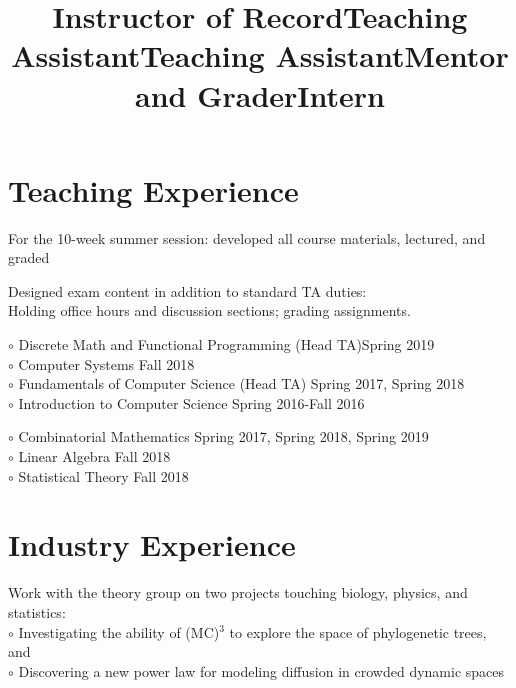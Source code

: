 \documentclass[margin]{res}
\begin{document}
\begin{resume}
\section{Teaching Experience}
\title{\textbf{Instructor of Record}}
\begin{position}
	For the 10-week summer session: developed all course materials, lectured, and graded
\end{position}

\title{\textbf{Teaching Assistant}}
\begin{position}
	Designed exam content in addition to standard TA duties: \\Holding office hours and discussion sections; grading assignments.
\end{position}

\dates{}
\title{\textbf{Teaching Assistant}}
\begin{position}
$\circ$ Discrete Math and Functional Programming (Head TA)\hfill Spring 2019\\
$\circ$ Computer Systems \hfill Fall 2018\\
$\circ$ Fundamentals of Computer Science (Head TA) \hfill Spring 2017, Spring 2018\\
$\circ$ Introduction to Computer Science \hfill Spring 2016-Fall 2016

\end{position}

\dates{}
\title{\textbf{Mentor and Grader}}
\begin{position}
$\circ$ Combinatorial Mathematics \hfill Spring 2017, Spring 2018, Spring 2019\\
$\circ$ Linear Algebra \hfill Fall 2018\\
$\circ$ Statistical Theory \hfill Fall 2018

\end{position}

\section{Industry Experience}

\title{\textbf{Intern}}
\begin{position}
Work with the theory group on two projects touching biology, physics, and statistics:\\
$\circ$ Investigating the ability of (MC)$^3$ to explore the space of phylogenetic trees, and \\
$\circ$ Discovering a new power law for modeling diffusion in crowded dynamic spaces
\end{position}


\end{resume}
\end{document}
